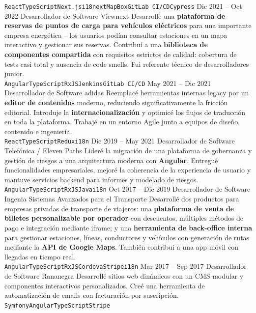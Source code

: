 \documentclass[9pt]{developercv} %
\begin{document}
\begin{entrylist}
{		\texttt{React}\slashsep\texttt{TypeScript}\slashsep\texttt{Next.js}\slashsep\texttt{i18next}\slashsep\texttt{MapBox}\slashsep\texttt{GitLab CI/CD}\slashsep\texttt{Cypress}}
	\entry
		{Dic 2021 -- Oct 2022}
		{Desarrollador de Software}
		{Viewnext}
		{Desarrollé una \textbf{plataforma de reservas de puntos de carga para vehículos eléctricos} para una importante empresa energética -- los usuarios podían consultar estaciones en un mapa interactivo y gestionar sus reservas. Contribuí a una \textbf{biblioteca de componentes compartida} con requisitos estrictos de calidad: cobertura de tests casi total y ausencia de code smells. Fui referente técnico de desarrolladores junior. \\
		\texttt{Angular}\slashsep\texttt{TypeScript}\slashsep\texttt{RxJS}\slashsep\texttt{Jenkins}\slashsep\texttt{GitLab CI/CD}}
	\entry
		{May 2021 -- Dic 2021}
		{Desarrollador de Software}
		{adidas}
		{Reemplacé herramientas internas legacy por un \textbf{editor de contenidos} moderno, reduciendo significativamente la fricción editorial. Introduje la \textbf{internacionalización} y optimicé los flujos de traducción en toda la plataforma. Trabajé en un entorno Agile junto a equipos de diseño, contenido e ingeniería. \\
		\texttt{React}\slashsep\texttt{TypeScript}\slashsep\texttt{Redux}\slashsep\texttt{i18n}}
	\entry
		{Dic 2019 -- May 2021}
		{Desarrollador de Software}
		{Telefónica / Eleven Paths}
		{Lideré la migración de una plataforma de gobernanza y gestión de riesgos a una arquitectura moderna con \textbf{Angular}. Entregué funcionalidades empresariales, mejoré la coherencia de la experiencia de usuario y mantuve servicios backend para informes y modelado de riesgos. \\
		\texttt{Angular}\slashsep\texttt{TypeScript}\slashsep\texttt{RxJS}\slashsep\texttt{Java}\slashsep\texttt{i18n}}
	\entry
		{Oct 2017 -- Dic 2019}
		{Desarrollador de Software}
		{Ingenia Sistemas Avanzados para el Transporte}
		{Desarrollé dos productos para empresas privadas de transporte de viajeros: una \textbf{plataforma de venta de billetes personalizable por operador} con descuentos, múltiples métodos de pago e integración mediante iframe; y una \textbf{herramienta de back-office interna} para gestionar estaciones, líneas, conductores y vehículos con generación de rutas mediante la \textbf{API de Google Maps}. También contribuí a una app móvil con llegadas en tiempo real. \\
		\texttt{Angular}\slashsep\texttt{TypeScript}\slashsep\texttt{RxJS}\slashsep\texttt{Cordova}\slashsep\texttt{Stripe}\slashsep\texttt{i18n}}
	\entry
		{Mar 2017 -- Sep 2017}
		{Desarrollador de Software}
		{Rananegra}
		{Desarrollé sitios web dinámicos con un CMS modular y componentes interactivos personalizados. Creé una herramienta de automatización de emails con facturación por suscripción. \\
		\texttt{Symfony}\slashsep\texttt{Angular}\slashsep\texttt{TypeScript}\slashsep\texttt{Stripe}}
\end{entrylist}
\end{document}

